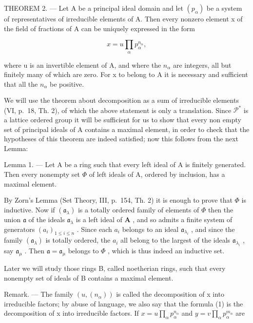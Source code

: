 THEOREM 2. --- Let A be a principal ideal domain and let \((p_{\alpha})\) be a system of representatives of irreducible elements of A. Then every nonzero element x of the field of fractions of A can be uniquely expressed in the form

\[
x = u \prod_ {\alpha} p _ {\alpha} ^ {n _ {\alpha}},\tag{1}
\]

where u is an invertible element of A, and where the \(n_{\alpha}\) are integers, all but finitely many of which are zero. For x to belong to A it is necessary and sufficient that all the \(n_{\alpha}\) be positive.

We will use the theorem about decomposition as a sum of irreducible elements (VI, p.~18, Th. 2), of which the above statement is only a translation. Since \(\mathcal{P}^*\) is a lattice ordered group it will be sufficient for us to show that every non empty set of principal ideals of A contains a maximal element, in order to check that the hypotheses of this theorem are indeed satisfied; now this follows from the next Lemma:

Lemma 1. --- Let A be a ring such that every left ideal of A is finitely generated. Then every nonempty set \(\Phi\) of left ideals of A, ordered by inclusion, has a maximal element.

By Zorn's Lemma (Set Theory, III, p.~154, Th. 2) it is enough to prove that \(\Phi\) is inductive. Now if \((\mathfrak{a}_{\lambda})\) is a totally ordered family of elements of \(\Phi\) then the union \(\mathfrak{a}\) of the ideals \(\mathfrak{a}_{\lambda}\) is a left ideal of \(\mathbf{A}\) , and so admits a finite system of generators \((a_i)_{1 \leqslant i \leqslant n}\) . Since each \(a_i\) belongs to an ideal \(\mathfrak{a}_{\lambda_i}\) , and since the family \((\mathfrak{a}_{\lambda})\) is totally ordered, the \(a_i\) all belong to the largest of the ideals \(\mathfrak{a}_{\lambda_i}\) , say \(\mathfrak{a}_{\mu}\) . Then \(\mathfrak{a} = \mathfrak{a}_{\mu}\) belongs to \(\Phi\) , which is thus indeed an inductive set.

Later we will study those rings B, called noetherian rings, such that every nonempty set of ideals of B contains a maximal element.

Remark. --- The family \((u, (n_{\alpha}))\) is called the decomposition of x into irreducible factors; by abuse of language, we also say that the formula (1) is the decomposition of x into irreducible factors. If \(x = u \prod_{\alpha} p_{\alpha}^{n_{\alpha}}\) and \(y = v \prod_{\alpha} p_{\alpha}^{m_{\alpha}}\) are

